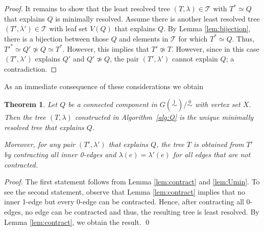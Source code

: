 \documentclass[smallextended]{svjour3}
\newcommand{\rev}[1]{\begingroup\color{blue}#1\endgroup}
\newcommand{\Ro}{\mathrel{\overset{0}{\sim}}}
\newcommand{\Rl}{\mathrel{\overset{1}{\sim}}}
\newtheorem{thm}{Theorem}
\begin{document}
{\begin{proof}
	It remains to show that the least resolved tree $(T,\lambda)\in \mathcal{T}$
	with $T^*\simeq Q$ that explains $Q$ is minimally resolved. 
	Assume there is another 
	least resolved tree $(T',\lambda') \in \mathcal{T}$ with leaf set $V(Q)$
   that explains $Q$. 
	By Lemma \ref{lem:bijection}, there is a bijection between those 
	$Q$ and elements in $\mathcal{T}$ for which  $T^*\simeq Q$. 
	Thus,  $T'^*\simeq Q'\not\simeq Q \simeq T^*$. However, this implies that 
	$T'\not\simeq T$. However, since in this case $(T',\lambda')$ explains $Q'$
	and  $Q'\not\simeq Q$, the pair $(T',\lambda')$ cannot explain $Q$;
	 a contradiction. 
\end{proof}	
}



\rev{As an immediate consequence of these considerations we obtain}
\begin{thm}
  Let $Q$ be a connected component in $G(\Rl)/\Ro$ with vertex set $X$.
  Then the tree $(T,\lambda)$ constructed in Algorithm~\ref{alg:Q} is the unique
  \rev{minimally} resolved tree that explains $Q$. 

\rev{	Moreover, for any pair $(T',\lambda')$ that explains $Q$, 
		the tree $T$ is obtained from $T'$ by contracting
	all \emph{inner} 0-edges and $\lambda(e) = \lambda'(e)$
	for all edges that are not contracted. }
  \label{thm:connComp}
\end{thm}
\begin{proof}
\rev{	The first statement follows from Lemma \ref{lem:contract} and \ref{lem:Umin}. 
	To see the second statement, observe that Lemma \ref{lem:contract} implies 
	that no inner 1-edge but every 0-edge can be contracted. 
	Hence, after contracting all 0-edges, no edge can be contracted and thus, 
	the resulting tree is least resolved. By Lemma \ref{lem:contract}, 
	we obtain the result.}
	\qed
\end{proof}
\end{document}

